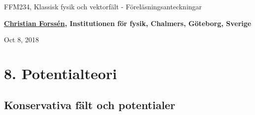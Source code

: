 \documentclass[%
oneside,                 %
final,                   %
10pt]{article}
\begin{document}

\newcommand{\exercisesection}[1]{\subsection*{#1}}







\thispagestyle{empty}

\begin{center}
{\LARGE\bf
\begin{spacing}{1.25}
FFM234, Klassisk fysik och vektorfält - Föreläsningsanteckningar
\end{spacing}
}
\end{center}


\begin{center}
{\bf \href{{http://fy.chalmers.se/subatom/tsp/}}{Christian Forssén}, Institutionen för fysik, Chalmers, Göteborg, Sverige${}^{}$} \\ [0mm]
\end{center}

\begin{center}
\end{center}
    

\begin{center}
Oct 8, 2018
\end{center}

\vspace{1cm}


\section*{8. Potentialteori}

\subsection*{Konservativa fält och potentialer}
\end{document}
